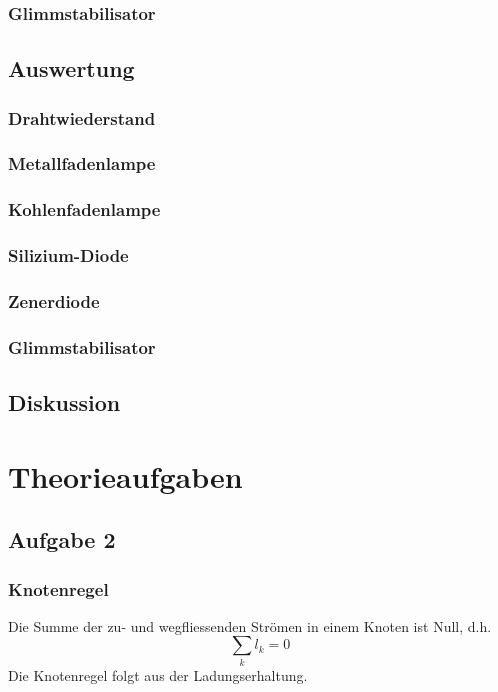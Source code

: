 \documentclass[12pt,a4paper]{article}
\begin{document}
\subsubsection*{Glimmstabilisator}


\subsection*{Auswertung}

\subsubsection*{Drahtwiederstand}

\subsubsection*{Metallfadenlampe}

\subsubsection*{Kohlenfadenlampe}

\subsubsection*{Silizium-Diode}

\subsubsection*{Zenerdiode}

\subsubsection*{Glimmstabilisator}


\subsection*{Diskussion}

\newpage
\section*{Theorieaufgaben}

\subsection*{Aufgabe 2}
\subsubsection*{Knotenregel}
Die Summe der zu- und wegfliessenden Str\"omen in einem Knoten ist Null, d.h.
\[ \sum_kl_k = 0 \]
Die Knotenregel folgt aus der Ladungserhaltung.
\end{document}
